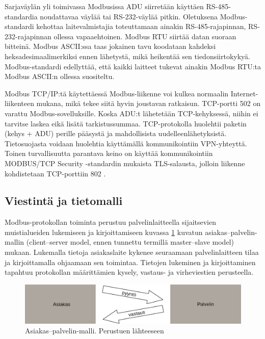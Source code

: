     Sarjaväylän yli toimivassa Modbusissa ADU siirretään käyttäen RS-485-standardia noudattavaa väylää tai RS-232-väylää pitkin. Oletuksena Modbus-standardi kehottaa laitevalmistajia toteuttamaan ainakin RS-485-rajapinnan, RS-232-rajapinnan ollessa vapaaehtoinen. Modbus \gls{RTU} siirtää datan suoraan bitteinä. Modbus \gls{ASCII}:ssa taas jokainen tavu koodataan kahdeksi heksadesimaalimerkiksi ennen lähetystä, mikä heikentää sen tiedonsiirtokykyä. Modbus-standardi edellyttää, että kaikki laitteet tukevat ainakin Modbus RTU:ta Modbus ASCII:n ollessa suositeltu. \parencite{modbusSerialSpec}

    Modbus TCP/IP:tä käytettäessä Modbus-liikenne voi kulkea normaalin Internet-liikenteen mukana, mikä tekee siitä hyvin joustavan ratkaisun. TCP-portti 502 on varattu Modbus-sovelluksille. \parencite{modbusTCPIPSpec} Koska ADU:t lähetetään TCP-kehyksessä, niihin ei tarvitse laskea eikä lisätä tarkistussummaa. TCP-protokolla huolehtii paketin (kehys + ADU) perille pääsystä ja mahdollisista uudelleenlähetyksistä. Tietosuojasta voidaan huolehtia käyttämällä kommunikointiin \gls{VPN}-yhteyttä. Toinen turvallisuutta parantava keino on käyttää kommunikointiin MODBUS/TCP Security -standardin mukaista TLS-salausta, jolloin liikenne kohdistetaan TCP-porttiin 802 \parencite{modbusTCPIPTLSSpec}.

  \subsection{Viestintä ja tietomalli}

  Modbus-protokollan toiminta perustuu palvelinlaitteella sijaitsevien muistialueiden lukemiseen ja kirjoittamiseen kuvassa \ref{fig:c_s} kuvatun asiakas--palvelin-mallin (client--server model, ennen tunnettu termillä master--slave model) mukaan.  Lukemalla tietoja asiakaslaite kykenee seuraamaan palvelinlaitteen tilaa ja kirjoittamalla ohjaamaan sen toimintaa. Tietojen lukeminen ja kirjoittaminen tapahtuu protokollan määrittämien kysely, vastaus- ja virheviestien perusteella. \parencite{modbusAppSpec}

  \begin{figure}[h]
    \centering
    \includegraphics[width=1\textwidth]{figures/client_server}
    \caption[Asiakas--palvelin-malli]{Asiakas--palvelin-malli.  Perustuen lähteeseen \parencite{modbusAppSpec}}
    \label{fig:c_s}
  \end{figure}

